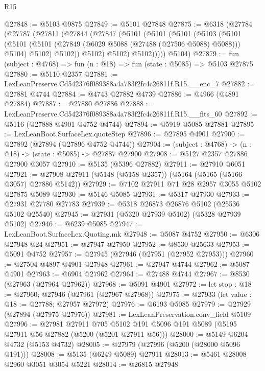 \begin{lexlean}{R15}
\begin{coremodule}
{{{{{{{{{{{@27848 := @5103 @9875
@27849 := @5101 @27848
@27875 := @6318
    (@27784
      (@27787
        (@27811
          (@27844
            (@27847
              (@5101
                (@5101
                  (@5101
                    (@5103
                      (@5101
                        (@5101
                          (@5101 (@27849 (@6029 @5088 (@27488 (@27506 @5088) @5088))) @5104)
                          @5102)
                        @5102))
                    @5102)
                  @5102)
                @5102)))))
      @5104)
@27879 := fun (subject : @4768) => fun (n : @18) => fun (state : @5085) => @5103 @27875
@27880 := @5110 @2357
@27881 := LexLeanPreserve.Cd542376f089388a4a783f2fc4c26811f.R15.__enc_7
@27882 := @27881 @4744
@27884 := @4743 @27882 @4739
@27886 := @4966 (@4891 @27884)
@27887 := @27880 @27886
@27888 := LexLeanPreserve.Cd542376f089388a4a783f2fc4c26811f.R15.__fits_60
@27892 := @5116 (@27888 @4901 @4752 @4744)
@27894 := @5919 @5085 @27881
@27895 := LexLeanBoot.SurfaceLex.quoteStep
@27896 := @27895 @4901
@27900 := @27892 (@27894 (@27896 @4752 @4744))
@27904 := (subject : @4768) -> (n : @18) -> (state : @5085) -> @27887 @27900
@27908 := @5127 @2357 @27886 @27900 @3057
@27910 := @5135 (@5396 @27882)
@27911 := @27910 @6051
@27921 := @27908 @27911 (@5148 (@5158 @2357)) (@5164 (@5165 (@5166 @3057) @27886 @5142))
@27929 := @7102 @27911 @71 @28 @2957 @3055 @5102 @27875 @5089
@27930 := @5146 @5085
@27931 := @5317 @27930
@27933 := @27931 @27780 @27783
@27939 := @5318 @26873 @26876 @5102 (@25536 @5102 @25540)
@27945 := @27931 (@5320 @27939 @5102) (@5328 @27939 @5102)
@27946 := @6239 @5085
@27947 := LexLeanBoot.SurfaceLex.Quoting.mk
@27948 := @5087 @4752
@27950 := @6306 @27948 @24
@27951 := @27947 @27950
@27952 := @8530 @25633
@27953 := @5091 @4752
@27957 := @27945 (@27946 (@27951 (@27952 @27953)))
@27960 := @27504 @4897 @4901 @27948
@27961 := @27947 @4744
@27962 := @5087 @4901
@27963 := @6904 @27962
@27964 := @27488 @4744
@27967 := @8530 (@27963 (@27964 @27962))
@27968 := @5091 @4901
@27972 := let stop : @18 := @27960; @27946 (@27961 (@27967 @27968))
@27975 := @27933 (let value : @18 := @27788; @27957 @27972)
@27976 := @6193 @5085
@27979 := @27929 (@27894 (@27975 @27976))
@27981 := LexLeanPreservation.conv_field @5109
@27996 := @27981
    @27911
    @705
    @5102
    @191
    @5096
    @191
    @5089
    (@5195 @27911 @56 @27882 (@5200 (@5201 @27911 @56)))
@28000 := @5149 @6204 @4732 (@5153 @4732)
@28005 := @27979 (@27996 (@5200 (@28000 @5096 @191)))
@28008 := @5135 (@6249 @5089) @27911
@28013 := @5461 @28008 @2960 @3051 @3054 @5221
@28014 := @26815 @27948
}}}}}}}}}}}
\end{coremodule}
\end{lexlean}
